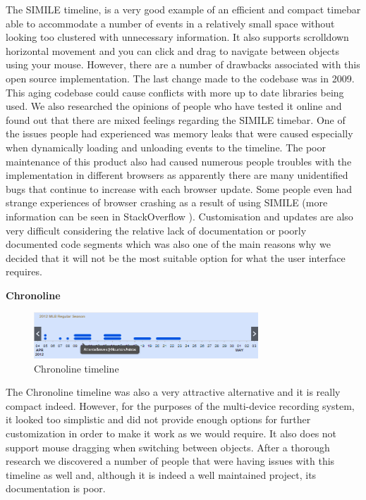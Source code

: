 \documentclass{l3proj}
\begin{document}
The SIMILE timeline, is a very good example of an efficient and compact timebar able to accommodate a number of events in a relatively small space without looking too clustered with unnecessary information. It also supports scrolldown horizontal movement and  you can click and drag to navigate between objects using your mouse. However, there are a number of drawbacks associated with this open source implementation. The last change made to the codebase was in 2009. This aging codebase could cause conflicts with more up to date libraries being used. We also researched the opinions of people who have tested it online and found out that there are mixed feelings regarding the SIMILE timebar. One of the issues people had experienced was memory leaks that were caused especially when dynamically loading and unloading events to the timeline. The poor maintenance of this product also had caused numerous people troubles with the implementation in different browsers as apparently there are many unidentified bugs that continue to increase with each browser update. Some people even had strange experiences of browser crashing as a result of using SIMILE (more information can be seen in StackOverflow \cite{StackOverflow}). Customisation and updates are also very difficult considering the relative lack of documentation or poorly documented code segments which was also one of the main reasons why we decided that it will not be the most suitable option for what the user interface requires.


\textbf{Chronoline}

\begin{figure}[ht!]
  \centering
\includegraphics[width=0.75\textwidth]{images/Chronoline.png}
\caption{Chronoline timeline}
\end{figure}

The Chronoline timeline was also a very attractive alternative and it is really compact indeed. However, for the purposes of the multi-device recording system, it looked too simplistic and did not provide enough options for further customization in order to make it work as we would require. It also does not support mouse dragging when switching between objects. After a thorough research we discovered a number of people that were having issues with this timeline as well and, although it is indeed a well maintained project, its documentation is poor.
\end{document}
